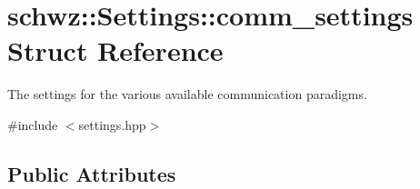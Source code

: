 \hypertarget{structschwz_1_1Settings_1_1comm__settings}{}\section{schwz\+:\+:Settings\+:\+:comm\+\_\+settings Struct Reference}
\label{structschwz_1_1Settings_1_1comm__settings}


The settings for the various available communication paradigms.  




{\ttfamily \#include $<$settings.\+hpp$>$}

\subsection*{Public Attributes}

